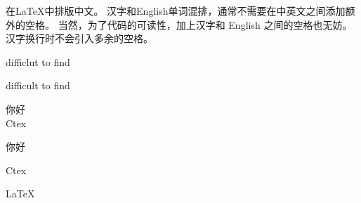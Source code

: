 \documentclass{ctexart}
\begin{document}
在\LaTeX{}中排版中文。
汉字和English单词混排，通常不需要在中英文之间添加额外的空格。
当然，为了代码的可读性，加上汉字和 English 之间的空格也无妨。
汉字换行时不会引入多余的空格。

difficlut to find

dif{}f{}icult to f{}ind

你好\\
Ctex    %

你好

Ctex    %

\LaTeX
\end{document}

